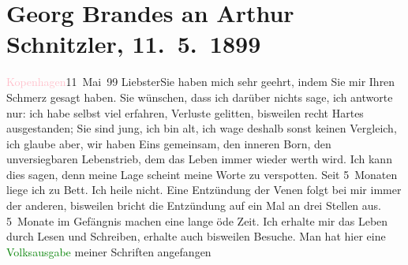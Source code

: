 

               \section[Georg Brandes an Arthur Schnitzler, 11. 5. 1899]{ Georg Brandes an Arthur Schnitzler, 11. 5. 1899}\nopagebreak{}\rehead{ }\normalsize\beginnumbering{} \toendnotes[C]{\smallbreak\pagebreak[2]} 
\toendnotes[C]{\smallbreak}\pstart
           \raggedleft{}{\pb}\textcolor{pink}{Kopenhagen}{}\ledrightnote{\textcolor{pink}{Kopenhagen}}{ }11 Mai 99\pend
           \pstart
           Liebster\hspace*{3.5em}Sie haben mich sehr geehrt, indem Sie mir
                    Ihren Schmerz gesagt haben. Sie wünschen, dass ich darüber nichts sage, ich
                    antworte  nur: ich habe selbst viel
                    erfahren, Verluste gelitten, bisweilen recht Hartes ausgestanden; Sie sind jung,
                    ich \introOben{}bin\introOben{} alt, ich wage
                    deshalb sonst keinen Vergleich, ich glaube aber, wir haben Eins gemeinsam, den inneren Born, den
                    unversiegbaren Lebenstrieb, dem das Leben immer wieder werth wird.\pend
           \pstart
           Ich kann dies sagen, denn meine Lage scheint meine Worte zu verspotten. Seit
                    5 Monaten liege ich zu Bett. Ich heile nicht. Eine Entzündung der Venen folgt
                    bei mir immer der anderen, bisweilen bricht die Entzündung auf ein Mal an drei
                    Stellen aus. 5 Monate im Gefängnis machen eine lange öde Zeit. Ich erhalte mir
                    das Leben {\pb}durch Lesen und
                    Schreiben, erhalte auch bisweilen Besuche. Man hat hier eine \textcolor{green}{Volksausgabe}{} meiner Schriften angefangen
